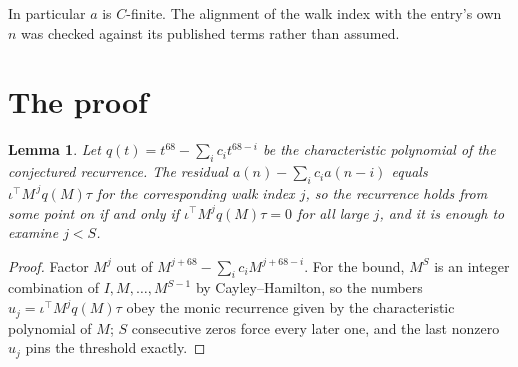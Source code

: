 \documentclass[11pt,a4paper]{article}
\theoremstyle{plain}
\newtheorem{lemma}[theorem]{Lemma}
\theoremstyle{definition}
\begin{document}
In particular $a$ is $C$-finite. The alignment of the walk index with the entry's own $n$ was
checked against its published terms rather than assumed.

\section{The proof}

\begin{lemma}\label{lem:crit}
Let $q(t)=t^{68}-\sum_i c_it^{68-i}$ be the characteristic polynomial of the
conjectured recurrence. The residual $a(n)-\sum_ic_ia(n-i)$ equals
$\iota^{\!\top}M^{\,j}q(M)\tau$ for the corresponding walk index $j$, so the recurrence
holds from some point on if and only if $\iota^{\!\top}M^{j}q(M)\tau=0$ for all large $j$,
and it is enough to examine $j<S$.
\end{lemma}

\begin{proof}
Factor $M^{j}$ out of $M^{j+68}-\sum_ic_iM^{j+68-i}$. For the bound, $M^{S}$
is an integer combination of $I,M,\dots,M^{S-1}$ by Cayley--Hamilton, so the numbers
$u_j=\iota^{\!\top}M^{j}q(M)\tau$ obey the monic recurrence given by the characteristic
polynomial of $M$; $S$ consecutive zeros force every later one, and the last nonzero $u_j$
pins the threshold exactly.
\end{proof}
\end{document}
